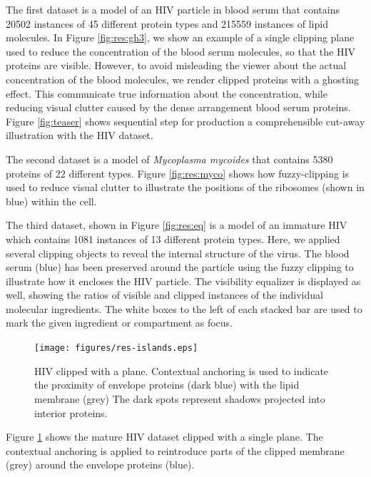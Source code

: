 The first dataset is a model of an HIV particle in blood serum that contains 20502 instances of 45 different protein types and 215559 instances of lipid molecules.
In Figure \ref{fig:res:gh3}, we show an example of a single clipping plane used to reduce the concentration of the blood serum molecules, so that the HIV proteins are visible. 
However, to avoid misleading the viewer about the actual concentration of the blood molecules, we render clipped proteins with a ghosting effect. 
This communicate true information about the concentration, while reducing visual clutter caused by the dense arrangement blood serum proteins.
Figure \ref{fig:teaser} shows sequential step for production a comprehensible cut-away illustration with the HIV dataset.

The second dataset is a model of \emph{Mycoplasma mycoides} that contains 5380 proteins of 22 different types. 
Figure \ref{fig:res:myco} shows how fuzzy-clipping is used to reduce visual clutter to illustrate the positions of the ribosomes (shown in blue) within the cell.

The third dataset, shown in Figure \ref{fig:res:eq} is a model of an immature HIV which contains 1081 instances of 13 different protein types. 
Here, we applied several clipping objects to reveal the internal structure of the virus. 
The blood serum (blue) has been preserved around the particle using the fuzzy clipping to illustrate how it encloses the HIV particle. 
The visibility equalizer is displayed as well, showing the ratios of visible and clipped instances of the individual molecular ingredients. 
The white boxes to the left of each stacked bar are used to mark the given ingredient or compartment as focus.

\begin{figure}[b]
\vspace{-4mm}
\centering
\texttt{[image: figures/res-islands.eps]}
\caption{\label{fig:res:islands}
HIV clipped with a plane. 
Contextual anchoring is used to indicate the proximity of envelope proteins (dark blue) with the lipid membrane (grey)
The dark spots represent shadows projected into interior proteins.}
\end{figure}

Figure \ref{fig:res:islands} shows the mature HIV dataset clipped with a single plane. 
The contextual anchoring is applied to reintroduce parts of the clipped membrane (grey) around the envelope proteins (blue).


